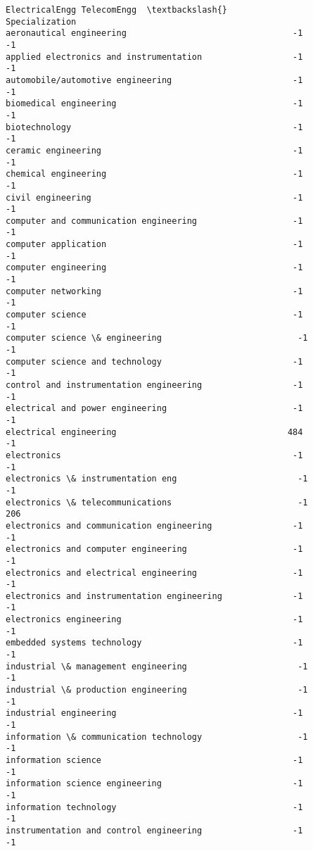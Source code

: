 \documentclass[11pt]{article}
\begin{document}
\begin{tcolorbox}[breakable, size=fbox, boxrule=.5pt, pad at break*=1mm, opacityfill=0]
\begin{Verbatim}[commandchars=\\\{\}]
                                             ElectricalEngg TelecomEngg  \textbackslash{}
Specialization
aeronautical engineering                                 -1          -1
applied electronics and instrumentation                  -1          -1
automobile/automotive engineering                        -1          -1
biomedical engineering                                   -1          -1
biotechnology                                            -1          -1
ceramic engineering                                      -1          -1
chemical engineering                                     -1          -1
civil engineering                                        -1          -1
computer and communication engineering                   -1          -1
computer application                                     -1          -1
computer engineering                                     -1          -1
computer networking                                      -1          -1
computer science                                         -1          -1
computer science \& engineering                           -1          -1
computer science and technology                          -1          -1
control and instrumentation engineering                  -1          -1
electrical and power engineering                         -1          -1
electrical engineering                                  484          -1
electronics                                              -1          -1
electronics \& instrumentation eng                        -1          -1
electronics \& telecommunications                         -1         206
electronics and communication engineering                -1          -1
electronics and computer engineering                     -1          -1
electronics and electrical engineering                   -1          -1
electronics and instrumentation engineering              -1          -1
electronics engineering                                  -1          -1
embedded systems technology                              -1          -1
industrial \& management engineering                      -1          -1
industrial \& production engineering                      -1          -1
industrial engineering                                   -1          -1
information \& communication technology                   -1          -1
information science                                      -1          -1
information science engineering                          -1          -1
information technology                                   -1          -1
instrumentation and control engineering                  -1          -1

\end{Verbatim}
\end{tcolorbox}
\end{document}
